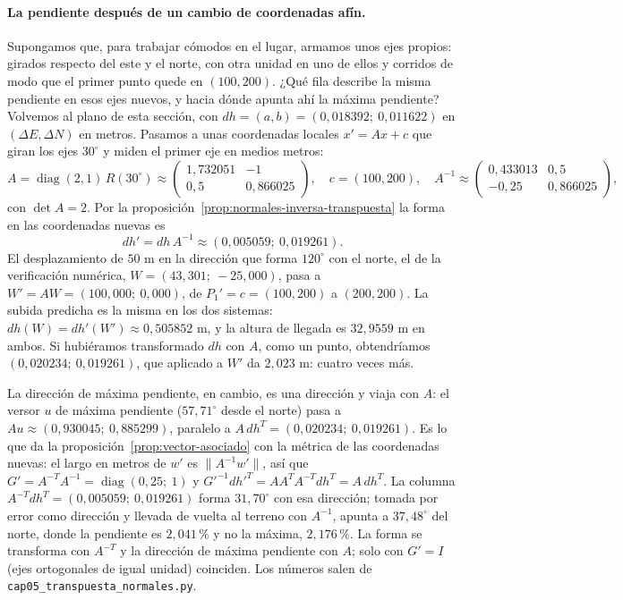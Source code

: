 \paragraph{La pendiente después de un cambio de coordenadas afín.} Supongamos que, para
trabajar cómodos en el lugar, armamos unos ejes propios: girados respecto del este y el norte,
con otra unidad en uno de ellos y corridos de modo que el primer punto quede en \((100,200)\). ¿Qué fila describe la
misma pendiente en esos ejes nuevos, y hacia dónde apunta ahí la máxima pendiente?
Volvemos al plano de esta sección, con
\(dh=(a,b)=(0{,}018392;\ 0{,}011622)\) en \((\Delta E,\Delta N)\) en metros. Pasamos a unas
coordenadas locales \(x'=Ax+c\) que giran los ejes \(30^\circ\) y miden el primer eje en
medios metros:
\[
  A=\operatorname{diag}(2,1)\,R(30^\circ)\approx\begin{pmatrix}1{,}732051&-1\\0{,}5&0{,}866025\end{pmatrix},
  \quad c=(100,200),\quad
  A^{-1}\approx\begin{pmatrix}0{,}433013&0{,}5\\-0{,}25&0{,}866025\end{pmatrix},
\]
con \(\det A=2\). Por la proposición~\ref{prop:normales-inversa-transpuesta} la forma en las
coordenadas nuevas es
\[
  dh'=dh\,A^{-1}\approx(0{,}005059;\ 0{,}019261).
\]
El desplazamiento de \(50\) m en la dirección que forma \(120^\circ\) con el norte, el de la verificación numérica,
\(W=(43{,}301;\ -25{,}000)\), pasa a \(W'=AW=(100{,}000;\ 0{,}000)\), de \(P_1'=c=(100,200)\)
a \((200,200)\). La subida predicha es la misma en los dos sistemas:
\(dh(W)=dh'(W')\approx0{,}505852\) m, y la altura de llegada es \(32{,}9559\) m en ambos. Si
hubiéramos transformado \(dh\) con \(A\), como un punto, obtendríamos
\((0{,}020234;\ 0{,}019261)\), que aplicado a \(W'\) da \(2{,}023\) m: cuatro veces más.

La dirección de máxima pendiente, en cambio, es una dirección y viaja con \(A\): el versor
\(u\) de máxima pendiente (\(57{,}71^\circ\) desde el norte) pasa a \(Au\approx(0{,}930045;\ 0{,}885299)\), paralelo a
\(A\,dh^T=(0{,}020234;\ 0{,}019261)\). Es lo que da la
proposición~\ref{prop:vector-asociado} con la métrica de las coordenadas nuevas: el largo
en metros de \(w'\) es \(\lVert A^{-1}w'\rVert\), así que
\(G'=A^{-T}A^{-1}=\operatorname{diag}(0{,}25;\ 1)\) y
\(G'^{-1}dh'^T=AA^TA^{-T}dh^T=A\,dh^T\). La columna \(A^{-T}dh^T=(0{,}005059;\ 0{,}019261)\)
forma \(31{,}70^\circ\) con esa dirección; tomada por error como dirección y llevada de vuelta
al terreno con \(A^{-1}\), apunta a \(37{,}48^\circ\) del norte, donde la pendiente es
\(2{,}041\)\,\% y no la máxima, \(2{,}176\)\,\%. La forma se transforma con \(A^{-T}\) y la
dirección de máxima pendiente con \(A\); solo con \(G'=I\) (ejes ortogonales de igual
unidad) coinciden. Los números salen de \texttt{cap05\_transpuesta\_normales.py}.

